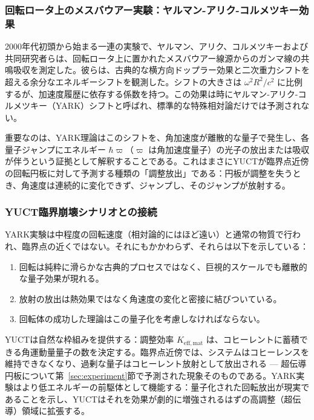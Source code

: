 \documentclass[12pt,a4paper]{article}
\begin{document}
	\subsubsection{回転ロータ上のメスバウアー実験：ヤルマン-アリク-コルメツキー効果}
	
	2000年代初頭から始まる一連の実験で、ヤルマン、アリク、コルメツキーおよび共同研究者らは、回転ロータ上に置かれたメスバウアー線源からのガンマ線の共鳴吸収を測定した。彼らは、古典的な横方向ドップラー効果と二次重力シフトを超える余分なエネルギーシフトを観測した。シフトの大きさは \(\omega^2 R^2 / c^2\) に比例するが、加速度履歴に依存する係数を持つ。この効果は時にヤルマン-アリク-コルメツキー（YARK）シフトと呼ばれ、標準的な特殊相対論だけでは予測されない。
	
	重要なのは、YARK理論はこのシフトを、角加速度が離散的な量子で発生し、各量子ジャンプにエネルギー \(\hbar \varpi\)（\(\varpi\) は角加速度量子）の光子の放出または吸収が伴うという証拠として解釈することである。これはまさにYUCTが臨界点近傍の回転円板に対して予測する種類の「調整放出」である：円板が調整を失うとき、角速度は連続的に変化できず、ジャンプし、そのジャンプが放射する。
	
	\subsubsection{YUCT臨界崩壊シナリオとの接続}
	
	YARK実験は中程度の回転速度（相対論的にはほど遠い）と通常の物質で行われ、臨界点の近くではない。それにもかかわらず、それらは以下を示している：
	\begin{enumerate}
		\item 回転は純粋に滑らかな古典的プロセスではなく、巨視的スケールでも離散的な量子効果が現れる。
		\item 放射の放出は熱効果ではなく角速度の変化と密接に結びついている。
		\item 回転体の成功した理論はこの量子化を考慮しなければならない。
	\end{enumerate}
	
	YUCTは自然な枠組みを提供する：調整効率 \(K_{\mathrm{eff,mat}}\) は、コヒーレントに蓄積できる角運動量量子の数を決定する。臨界点近傍では、システムはコヒーレンスを維持できなくなり、過剰な量子はコヒーレント放射として放出される — 超伝導円板について第~\ref{sec:experiment}節で予測された現象そのものである。YARK実験はより低エネルギーの前駆体として機能する：量子化された回転放出が現実であることを示し、YUCTはそれを効果が劇的に増強されるはずの高調整（超伝導）領域に拡張する。
	
\end{document}
